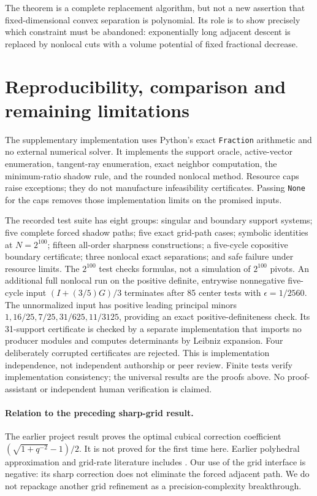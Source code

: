 \documentclass[11pt]{article}
\theoremstyle{remark}\newtheorem{remark}[theorem]{Remark}
\begin{document}
The theorem is a complete replacement algorithm, but not a new assertion that fixed-dimensional convex separation is polynomial. Its role is to show precisely which constraint must be abandoned: exponentially long adjacent descent is replaced by nonlocal cuts with a volume potential of fixed fractional decrease.

\section{Reproducibility, comparison and remaining limitations}
The supplementary implementation uses Python's exact \texttt{Fraction} arithmetic and no external numerical solver. It implements the support oracle, active-vector enumeration, tangent-ray enumeration, exact neighbor computation, the minimum-ratio shadow rule, and the rounded nonlocal method. Resource caps raise exceptions; they do not manufacture infeasibility certificates. Passing \texttt{None} for the caps removes those implementation limits on the promised inputs.

The recorded test suite has eight groups: singular and boundary support systems; five complete forced shadow paths; five exact grid-path cases; symbolic identities at $N=2^{100}$; fifteen all-order sharpness constructions; a five-cycle copositive boundary certificate; three nonlocal exact separations; and safe failure under resource limits. The $2^{100}$ test checks formulas, not a simulation of $2^{100}$ pivots. An additional full nonlocal run on the positive definite, entrywise nonnegative five-cycle input $(I+(3/5)G)/3$ terminates after 85 center tests with $\epsilon=1/2560$. The unnormalized input has positive leading principal minors $1,16/25,7/25,31/625,11/3125$, providing an exact positive-definiteness check. Its 31-support certificate is checked by a separate implementation that imports no producer modules and computes determinants by Leibniz expansion. Four deliberately corrupted certificates are rejected. This is implementation independence, not independent authorship or peer review. Finite tests verify implementation consistency; the universal results are the proofs above. No proof-assistant or independent human verification is claimed.

\paragraph{Relation to the preceding sharp-grid result.}
The earlier project result \cite{M37} proves the optimal cubical correction coefficient $(\sqrt{1+q^{-2}}-1)/2$. It is not proved for the first time here. Earlier polyhedral approximation and grid-rate literature includes \cite{Yildirim12,KLSV17}. Our use of the grid interface is negative: its sharp correction does not eliminate the forced adjacent path. We do not repackage another grid refinement as a precision-complexity breakthrough.
\end{document}
